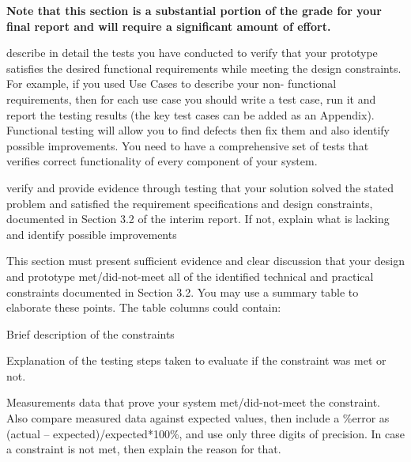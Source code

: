 \documentclass[../main.tex]{subfiles}
\begin{document}
\begin{newrequirements}
    \textbf{Note that this section is a substantial 
    portion of the grade for your final 
    report and will require a significant 
    amount of effort.}

    \begin{todolist}
    \item [\done] describe in detail the tests you have 
        conducted to verify that your prototype 
        satisfies the desired functional 
        requirements while meeting the design 
        constraints. For example, if you used 
        Use Cases to describe your non-
        functional requirements, then for each 
        use case you should write a test case, 
        run it and report the testing results
        (the key test cases can be added as an 
        Appendix). Functional testing will 
        allow you to find defects then fix them 
        and also identify possible 
        improvements.  You need to have a 
        comprehensive set of tests that 
        verifies correct functionality of every 
        component of your system. 

    \item [\done] verify and provide evidence through 
        testing that your solution solved the 
        stated problem and satisfied the 
        requirement specifications and design 
        constraints, documented in Section 3.2 
        of the interim report. If not, explain 
        what is lacking and identify possible 
        improvements 

    \item [\done] This section must present sufficient 
        evidence and clear discussion that your 
        design and prototype met/did-not-meet 
        all of the identified technical and 
        practical constraints documented in 
        Section 3.2. You may use a summary 
        table to elaborate these points. The 
        table columns could contain: 

    \begin{todolist}
    \item Brief description of the constraints 

    \item Explanation of the testing steps taken 
        to evaluate if the constraint was met 
        or not. 

    \item Measurements data that prove your 
        system met/did-not-meet the constraint. 
        Also compare measured data against 
        expected values, then include a \%error 
        as (actual – expected)/expected*100\%, 
        and use only three digits of precision. 
        In case a constraint is not met, then 
        explain the reason for that. 
    \end{todolist}


\end{todolist}
\end{newrequirements}
\end{document}
